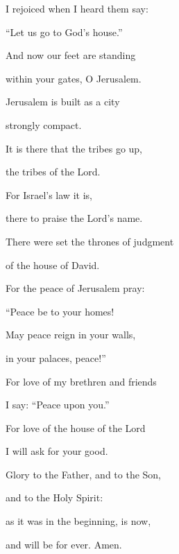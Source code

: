 \noindent I rejoiced when I heard them say: ~\GreStar{}~\nopagebreak

“Let us go to God’s house.”

\noindent And now our feet are standing ~\GreStar{}~\nopagebreak

within your gates, O Jerusalem.

\noindent Jerusalem is built as a city ~\GreStar{}~\nopagebreak

strongly compact.

\noindent It is there that the tribes go up, ~\GreStar{}~\nopagebreak

the tribes of the Lord.

\noindent For Israel’s law it is, ~\GreStar{}~\nopagebreak

there to praise the Lord’s name.

\noindent There were set the thrones of judgment ~\GreStar{}~\nopagebreak

of the house of David.

\noindent For the peace of Jerusalem pray: ~\GreStar{}~\nopagebreak

“Peace be to your homes!

\noindent May peace reign in your walls, ~\GreStar{}~\nopagebreak

in your palaces, peace!”

\noindent For love of my brethren and friends ~\GreStar{}~\nopagebreak

I say: “Peace upon you.”

\noindent For love of the house of the Lord ~\GreStar{}~\nopagebreak

I will ask for your good.

\noindent Glory to the Father, and to the Son,~\GreStar{}~\nopagebreak

and to the Holy Spirit:

\noindent as it was in the beginning, is now,~\GreStar{}~\nopagebreak

and will be for ever. Amen.
